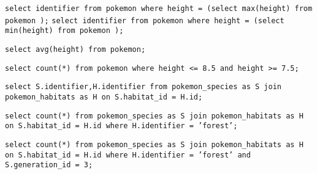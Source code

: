 \begin{qexo}
\end{qexo}
\texttt{select identifier from pokemon where height = (select max(height) from pokemon );} 
\texttt{select identifier from pokemon where height = (select min(height) from pokemon );}  

\begin{qexo}
\end{qexo}
\texttt{select avg(height) from pokemon;} 



\begin{qexo}
\end{qexo}
 \texttt{select count(*) from pokemon where height <= 8.5 and height >= 7.5;}  



\begin{qexo}
\end{qexo}
\texttt{select S.identifier,H.identifier from pokemon\_species as S join pokemon\_habitats as H on S.habitat\_id = H.id;}

\begin{qexo}
\end{qexo}
\texttt{select count(*) from pokemon\_species as S join pokemon\_habitats as H on S.habitat\_id = H.id where H.identifier = 'forest';}   

\begin{qexo}
\end{qexo}
\texttt{select count(*) from pokemon\_species as S join pokemon\_habitats as H on S.habitat\_id = H.id where H.identifier = 'forest' and S.generation\_id = 3;} 












